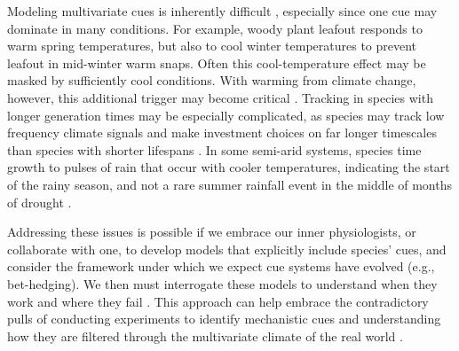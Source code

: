 \documentclass[11pt,letterpaper]{article}
\begin{document}
Modeling multivariate cues is inherently difficult \citep{chuine2016}, especially since one cue may dominate in many conditions. For example, woody plant leafout responds to warm spring temperatures, but also to cool winter temperatures to prevent leafout in mid-winter warm snaps. Often this cool-temperature effect may be masked by sufficiently cool conditions. With warming from climate change, however, this additional trigger may become critical \citep[and potentially lead many phenological models to fail spectacularly in the future, see][]{chuine2016}. Tracking in species with longer generation times may be especially complicated, as species may track low frequency climate signals and make investment choices on far longer timescales than species with shorter lifespans \citep{morris2008}. In some semi-arid systems, species time growth to pulses of rain that occur with cooler temperatures, indicating the start of the rainy season, and not a rare summer rainfall event in the middle of months of drought \citep{wainwright2013}. 

Addressing these issues is possible if we embrace our inner physiologists, or collaborate with one, to develop models that explicitly include species' cues, and consider the framework under which we expect cue systems have evolved (e.g., bet-hedging). We then must interrogate these models to understand when they work and where they fail \citep[see][for an example]{johanOCR}. This approach can help embrace the contradictory pulls of conducting experiments to identify mechanistic cues and understanding how they are filtered through the multivariate climate of the real world \citep[see][]{Wilczek:2010ad,Wilczek:2009oa}.
\end{document}
